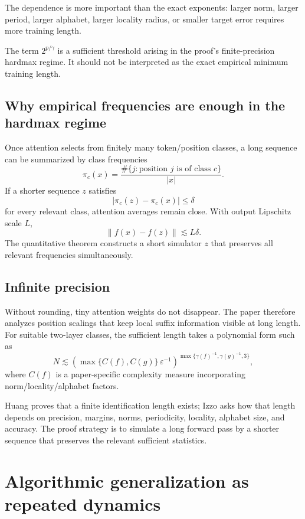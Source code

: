 \documentclass[11pt,a4paper,oneside,openany]{memoir}
\theoremstyle{definition}
\begin{document}
The dependence is more important than the exact exponents: larger norm, larger period, larger alphabet, larger locality radius, or smaller target error requires more training length.

\begin{paperbox}
The term $2^{p/\gamma}$ is a sufficient threshold arising in the proof's finite-precision hardmax regime.  It should not be interpreted as the exact empirical minimum training length.
\end{paperbox}

\section{Why empirical frequencies are enough in the hardmax regime}
Once attention selects from finitely many token/position classes, a long sequence can be summarized by class frequencies
\[
\pi_c(x)=\frac{\#\{j:\text{position }j\text{ is of class }c\}}{|x|}.
\]
If a shorter sequence $z$ satisfies
\[
|\pi_c(z)-\pi_c(x)|\le\delta
\]
for every relevant class, attention averages remain close.  With output Lipschitz scale $L$,
\[
\|f(x)-f(z)\|\lesssim L\delta.
\]
The quantitative theorem constructs a short simulator $z$ that preserves all relevant frequencies simultaneously.

\section{Infinite precision}
Without rounding, tiny attention weights do not disappear.  The paper therefore analyzes position scalings that keep local suffix information visible at long length.  For suitable two-layer classes, the sufficient length takes a polynomial form such as
\[
N\lesssim
\left(
\max\{C(f),C(g)\}\,\varepsilon^{-1}
\right)^{\max\{\gamma(f)^{-1},\gamma(g)^{-1},3\}},
\]
where $C(f)$ is a paper-specific complexity measure incorporating norm/locality/alphabet factors.

\begin{presentbox}
Huang proves that a finite identification length exists; Izzo asks how that length depends on precision, margins, norms, periodicity, locality, alphabet size, and accuracy.  The proof strategy is to simulate a long forward pass by a shorter sequence that preserves the relevant sufficient statistics.
\end{presentbox}

\chapter{Algorithmic generalization as repeated dynamics}
\end{document}
